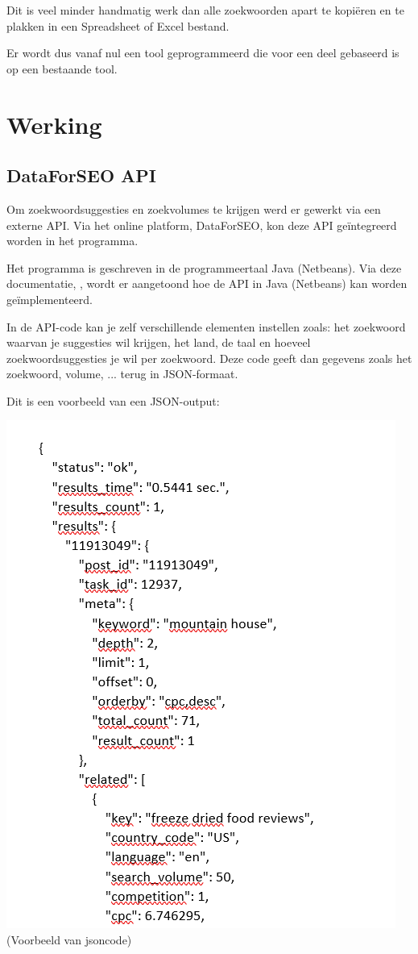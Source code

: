 Dit is veel minder handmatig werk dan alle zoekwoorden apart te kopiëren en te plakken in een Spreadsheet of Excel bestand. 

Er wordt dus vanaf nul een tool geprogrammeerd die voor een deel gebaseerd is op een bestaande tool. 

\section{Werking}
\label{ch: Werking}

\subsection{DataForSEO API}
\label{ch: DataForSEO API}

Om zoekwoordsuggesties en zoekvolumes te krijgen werd er gewerkt via een externe API. Via het online platform, DataForSEO, kon deze API geïntegreerd worden in het programma. 

Het programma is geschreven in de programmeertaal Java (Netbeans). Via deze documentatie, \textcite{DATAFORSEO}, wordt er aangetoond hoe de API in Java (Netbeans) kan worden geïmplementeerd. 

In de API-code kan je zelf verschillende elementen instellen zoals: het zoekwoord waarvan je suggesties wil krijgen, het land, de taal en hoeveel zoekwoordsuggesties je wil per zoekwoord. Deze code geeft dan gegevens zoals het zoekwoord, volume, ... terug in JSON-formaat. 

Dit is een voorbeeld van een JSON-output: 

\includegraphics[width=\linewidth]{Bachelorproef/bachelor/img/jsoncode.PNG}
(Voorbeeld van jsoncode)           

